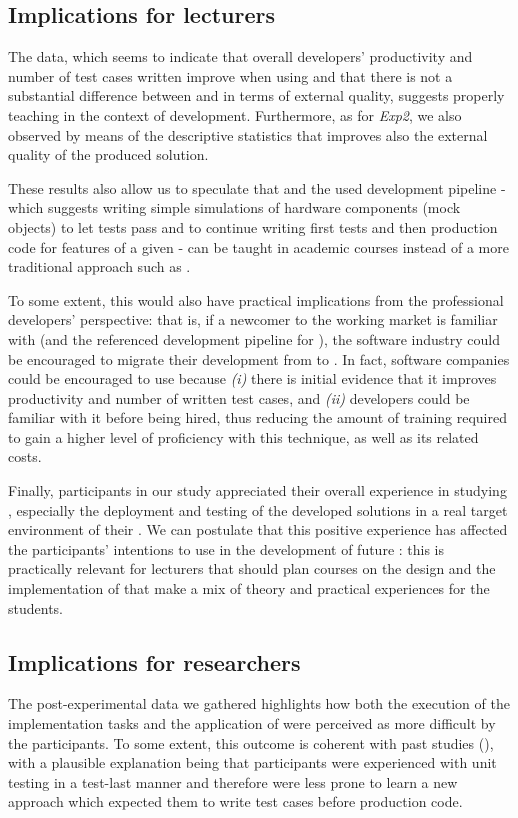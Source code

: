 \subsection{Implications for lecturers}
The data, which seems to indicate that overall developers' productivity and number of test cases written improve when using \tdd and that there is not a substantial difference between \tdd and \notdd in terms of external quality, suggests properly teaching \tdd in the context of \es development. Furthermore, as for \textit{Exp2}, we also observed by means of the descriptive statistics that \tdd improves also the external quality of the produced solution.

These results also allow us to speculate that \tdd and the used development pipeline \cite{TDDEC} - which suggests writing simple simulations of hardware components (\ie mock objects) to let tests pass and to continue writing first tests and then production code for features of a given \es - can be taught in academic \es courses instead of a more traditional approach such as \notdd.

To some extent, this would also have practical implications from the professional developers' perspective: that is, if a newcomer to the working market is familiar with \tdd (and the referenced development pipeline for \ess), the software industry could be encouraged to migrate their development from \notdd to \tdd. In fact, software companies could be encouraged to use \tdd because \textit{(i)} there is initial evidence that it improves productivity and number of written test cases, and \textit{(ii)} developers could be familiar with it before being hired, thus reducing the amount of training required to gain a higher level of proficiency with this technique, as well as its related costs.

Finally, participants in our study appreciated their overall experience in studying \tdd, especially the deployment and testing of the developed solutions in a real target environment of their \es. 
We can postulate that this positive experience has affected the participants' intentions to use \tdd in the development of future \ess: this is practically relevant for lecturers that should plan courses on the design and the implementation of \ess that make a mix of theory and practical experiences for the students.

\subsection{Implications for researchers} 
The post-experimental data we gathered highlights how both the execution of the implementation tasks and the application of \tdd were perceived as more difficult by the participants. 
To some extent, this outcome is coherent with past studies (\eg \cite{DBLP:conf/xpu/0001SBFC20, DBLP:conf/esem/RomanoZBPS22}), with a plausible explanation being that participants were experienced with unit testing in a test-last manner and therefore were less prone to learn a new approach which expected them to write test cases before production code. 

